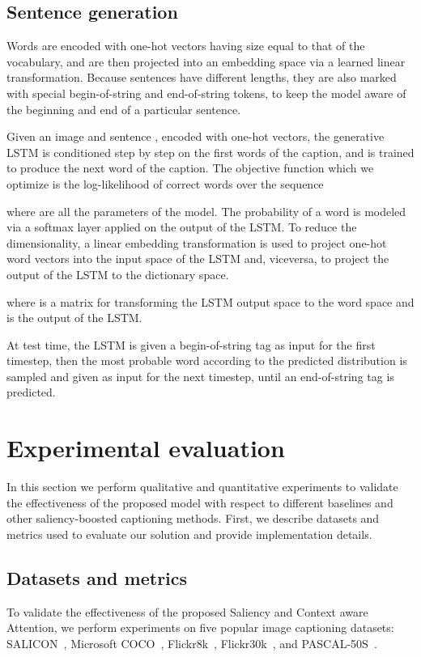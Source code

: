 \subsection{Sentence generation}
Words are encoded with one-hot vectors having size equal to that of the vocabulary, and are then projected into an embedding space via a learned linear transformation. Because sentences have different lengths, they are also marked with special begin-of-string and end-of-string tokens, to keep the model aware of the beginning and end of a particular sentence.

Given an image and sentence , encoded with one-hot vectors, the generative LSTM is conditioned step by step on the first  words of the caption, and is trained to produce the next word of the caption. The objective function which we optimize is the log-likelihood of correct words over the sequence

where  are all the parameters of the model. The probability of a word is modeled via a softmax layer applied on the output of the LSTM. To reduce the dimensionality, a linear embedding transformation is used to project one-hot word vectors into the input space of the LSTM and, viceversa, to project the output of the LSTM to the dictionary space.

where  is a matrix for transforming the LSTM output space to the word space and  is the output of the LSTM.

At test time, the LSTM is given a begin-of-string tag as input for the first timestep, then the most probable word according to the predicted distribution is sampled and given as input for the next timestep, until an end-of-string tag is predicted.



\section{Experimental evaluation}
In this section we perform qualitative and quantitative experiments to validate the effectiveness of the proposed model with respect to different baselines and other saliency-boosted captioning methods. First, we describe datasets and metrics used to evaluate our solution and provide implementation details. 

\subsection{Datasets and metrics}
\label{sec:dataset_metrics}
To validate the effectiveness of the proposed Saliency and Context aware Attention, we perform experiments on five popular image captioning datasets: SALICON~\cite{jiang2015salicon}, Microsoft COCO~\cite{lin2014microsoft}, Flickr8k~\cite{hodosh2013framing}, Flickr30k~\cite{young2014image}, and PASCAL-50S~\cite{vedantam2015cider}.


